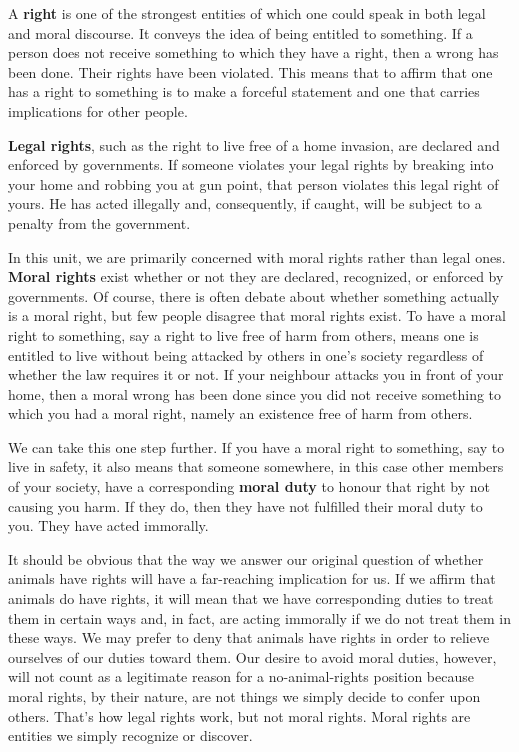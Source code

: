 \documentclass[
]{book}
\begin{document}
A \textbf{right} is one of the strongest entities of which one could speak in both legal and moral discourse. It conveys the idea of being entitled to something. If a person does not receive something to which they have a right, then a wrong has been done. Their rights have been violated. This means that to affirm that one has a right to something is to make a forceful statement and one that carries implications for other people.

\textbf{Legal rights}, such as the right to live free of a home invasion, are declared and enforced by governments. If someone violates your legal rights by breaking into your home and robbing you at gun point, that person violates this legal right of yours. He has acted illegally and, consequently, if caught, will be subject to a penalty from the government.

In this unit, we are primarily concerned with moral rights rather than legal ones. \textbf{Moral rights} exist whether or not they are declared, recognized, or enforced by governments. Of course, there is often debate about whether something actually is a moral right, but few people disagree that moral rights exist.
To have a moral right to something, say a right to live free of harm from others, means one is entitled to live without being attacked by others in one's society regardless of whether the law requires it or not. If your neighbour attacks you in front of your home, then a moral wrong has been done since you did not receive something to which you had a moral right, namely an existence free of harm from others.

We can take this one step further. If you have a moral right to something, say to live in safety, it also means that someone somewhere, in this case other members of your society, have a corresponding \textbf{moral duty} to honour that right by not causing you harm. If they do, then they have not fulfilled their moral duty to you. They have acted immorally.

It should be obvious that the way we answer our original question of whether animals have rights will have a far-reaching implication for us. If we affirm that animals do have rights, it will mean that we have corresponding duties to treat them in certain ways and, in fact, are acting immorally if we do not treat them in these ways.
We may prefer to deny that animals have rights in order to relieve ourselves of our duties toward them. Our desire to avoid moral duties, however, will not count as a legitimate reason for a no-animal-rights position because moral rights, by their nature, are not things we simply decide to confer upon others. That's how legal rights work, but not moral rights. Moral rights are entities we simply recognize or discover.
\end{document}
